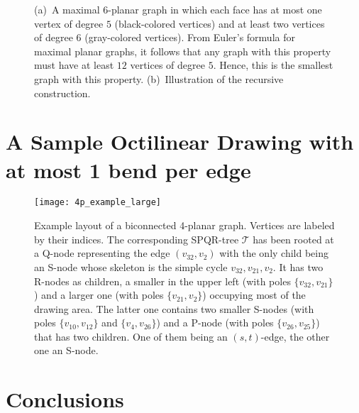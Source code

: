 \documentclass[a4paper,twoside,11pt]{article}
\begin{document}
\begin{figure}[t]
    \centering
    \begin{minipage}[b]{.48\textwidth}
        \centering
    \end{minipage}
    \begin{minipage}[b]{.48\textwidth}
        \centering
    \end{minipage}
    \caption{(a)~A maximal $6$-planar graph in which each face has at most one vertex of degree $5$ (black-colored vertices) and at least two vertices of degree $6$ (gray-colored vertices).
    From Euler's formula for maximal planar graphs, it follows that any graph with this property must have at least $12$ vertices of degree $5$.
    Hence, this is the smallest graph with this property.
    (b)~Illustration of the recursive construction.}
    \label{fig:6p_twobends_construction}
\end{figure}

\section{A Sample Octilinear Drawing with at most 1 bend per edge}
\label{sec:sample}


\begin{figure}[h!]
    \centering
    \texttt{[image: 4p\_example\_large]}
    \caption{Example layout of a biconnected 4-planar graph. Vertices are labeled by their indices. The
    corresponding SPQR-tree $\mathcal{T}$ has been rooted at a Q-node
    representing the edge $(v_{32}, v_{2})$ with the only child being an
    S-node whose skeleton is the simple cycle $v_{32}, v_{21}, v_{2}$.
    It has two R-nodes as children, a smaller in the upper left (with
    poles $\{ v_{32}, v_{21} \}$) and a larger one (with poles $ \{
    v_{21}, v_{2} \}$) occupying most of the drawing area. The latter
    one contains two smaller S-nodes (with poles $\{ v_{10}, v_{12} \}$
    and $\{ v_{4}, v_{26} \}$) and a P-node (with poles $ \{
    v_{26},v_{25} \}$) that has two children. One of them being an
    $(s,t)$-edge, the other one an S-node.}
    \label{fig:4p_example_large}
\end{figure}

\section{Conclusions}
\label{sec:conclusions}
\end{document}

